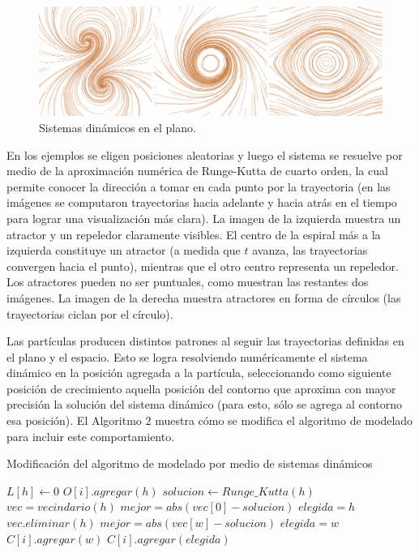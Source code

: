 \begin{figure}[htb!]
  \centerline{\includegraphics[width=12cm]{figures/Fig2}}
  \caption{Sistemas dinámicos en el plano.}
  \label{fg:sistdin2}
\end{figure}

En los ejemplos se eligen posiciones aleatorias y luego el sistema se resuelve por medio de la aproximación numérica de Runge-Kutta de cuarto orden, la cual permite conocer la direcci\'on a tomar en cada punto por la trayectoria (en las im\'agenes se computaron trayectorias hacia adelante y hacia atrás en el tiempo para lograr una visualizaci\'on más clara).
La imagen de la izquierda muestra un atractor y un repeledor claramente visibles.
El centro de la espiral m\'as a la izquierda constituye un atractor (a medida que $t$ avanza, las trayectorias convergen hacia el punto), mientras que el otro centro representa un repeledor.
Los atractores pueden no ser puntuales, como muestran las restantes dos im\'agenes.
La imagen de la derecha muestra atractores en forma de c\'irculos (las trayectorias ciclan por el c\'irculo).

Las part\'iculas producen distintos patrones al seguir las trayectorias definidas en el plano y el espacio.
Esto se logra resolviendo num\'ericamente el sistema din\'amico en la posici\'on agregada a la part\'icula, seleccionando como siguiente posici\'on de crecimiento aquella posici\'on del contorno que aproxima con mayor precisión la soluci\'on del sistema din\'amico (para esto, sólo se agrega al contorno esa posición).
El Algoritmo $2$ muestra cómo se modifica el algoritmo de modelado para incluir este comportamiento.

\begin{algorithm}[h!]
\caption{Modificación del algoritmo de modelado por medio de sistemas dinámicos}
\begin{algorithmic}
\State $L[h]\gets 0$ 
\State $O[i].agregar(h)$
\State $solucion \gets Runge\_Kutta(h)$
\State $vec = vecindario(h)$
\State $mejor = abs(vec[0] - solucion)$
\State $elegida = h$
\State $vec.eliminar(h)$
        \State $mejor = abs(vec[w]-solucion)$
        \State $elegida = w$
    \EndIf
        \State $C[i].agregar(w)$
    \EndIf
\EndFor
{}
\State $C[i].agregar(elegida)$
\end{algorithmic}
\end{algorithm}

